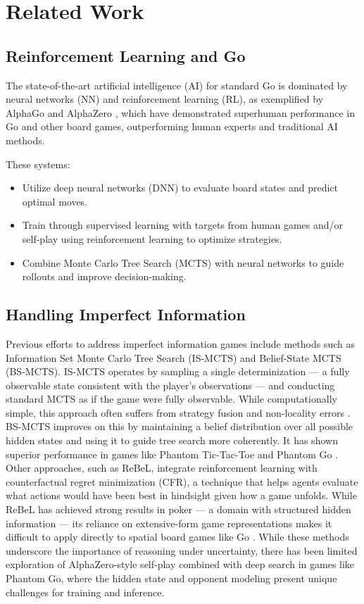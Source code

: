 \documentclass[12pt,oneside,openright]{article}
\begin{document}
\section{Related Work}

\subsection{Reinforcement Learning and Go}

The state-of-the-art artificial intelligence (AI) for standard Go is dominated
by neural networks (NN) and reinforcement learning (RL), as exemplified by
AlphaGo \cite{Silver2016alphago} and
AlphaZero \cite{Silver2017alphazero}, which have demonstrated
superhuman performance in Go and other board games, outperforming human experts
and traditional AI methods.

These systems:
\begin{itemize}
    \item Utilize deep neural networks (DNN) to evaluate board states and predict optimal moves.
    \item Train through supervised learning with targets from human games and/or self-play using reinforcement learning to optimize strategies.
    \item Combine Monte Carlo Tree Search (MCTS) with neural networks to guide rollouts and improve decision-making.
\end{itemize}

\subsection{Handling Imperfect Information}
Previous efforts to address imperfect information games include methods such as
Information Set Monte Carlo Tree Search (IS-MCTS) and Belief-State MCTS (BS-MCTS).
IS-MCTS operates by sampling a single determinization — a fully observable state
consistent with the player's observations — and conducting standard MCTS as if
the game were fully observable. While computationally simple, this approach often
suffers from strategy fusion and non-locality errors \cite{Cowling2012ismcts}.
BS-MCTS improves on this by maintaining a belief distribution over all possible
hidden states and using it to guide tree search more coherently. It has shown
superior performance in games like Phantom Tic-Tac-Toe and
Phantom Go \cite{Wang2015bsmcts}.
Other approaches, such as ReBeL, integrate reinforcement
learning with counterfactual regret minimization (CFR), a technique that helps
agents evaluate what actions would have been best in hindsight given how a game
unfolds. While ReBeL has achieved strong results in poker — a domain with
structured hidden information — its reliance on extensive-form game representations
makes it difficult to apply directly to spatial board games like Go \cite{Brown2020rebel}.
While these methods underscore the importance of reasoning under uncertainty,
there has been limited exploration of AlphaZero-style self-play combined with
deep search in games like Phantom Go, where the hidden state and opponent modeling
present unique challenges for training and inference.
\end{document}
